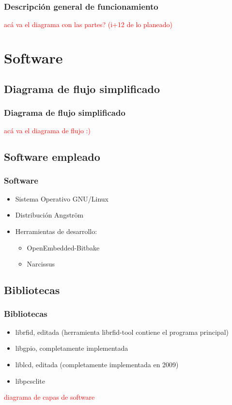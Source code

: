 \documentclass{beamer}
\begin{document}
\begin{frame}
	\frametitle{Descripción general de funcionamiento}
	\textcolor{red}{acá va el diagrama con las partes? (i+12 de lo planeado)}
\end{frame}	
	
\section{Software}
\subsection{Diagrama de flujo simplificado}
\begin{frame}
	\frametitle{Diagrama de flujo simplificado}
	\textcolor{red}{acá va el diagrama de flujo :)}
\end{frame}		
	
\subsection{Software empleado}
\begin{frame}
	\frametitle{Software}
	\begin{itemize}
		\item Sistema Operativo GNU/Linux
		\item Distribución Angström
		\item Herramientas de desarrollo: 
		\begin{itemize} 
			\item OpenEmbedded-Bitbake 
			\item Narcissus 
		\end{itemize}
	\end{itemize}
\end{frame}		

\subsection{Bibliotecas}
\begin{frame}
	\frametitle{Bibliotecas}
	\begin{itemize}
		\item librfid, editada (herramienta librfid-tool contiene el programa principal)
		\item libgpio, completamente implementada
		\item liblcd, editada (completamente implementada en 2009)
		\item libpcsclite
	\end{itemize}

\textcolor{red}{diagrama de capas de software}
\end{frame}
\end{document}
